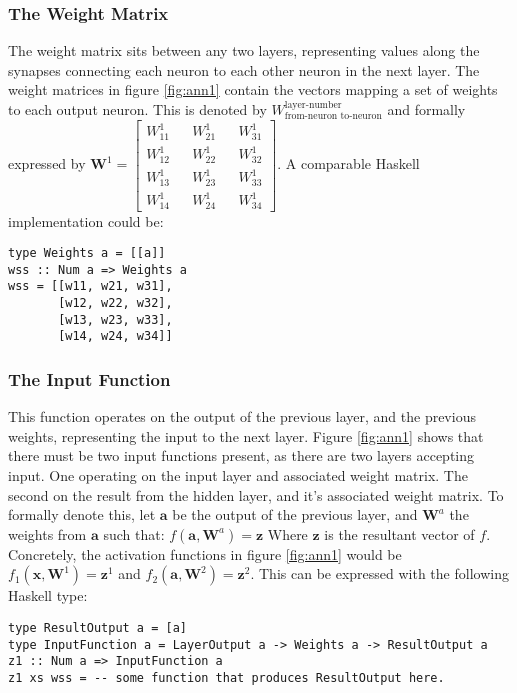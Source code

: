 \documentclass[a4paper]{article}
\begin{document}
\subsubsection{The Weight Matrix}
The weight matrix sits between any two layers, representing values along
the synapses connecting each neuron to each other neuron in the next layer.
The weight matrices in figure \ref{fig:ann1} contain the vectors mapping a set
of weights to each output neuron. This is denoted by 
$W^{\text{layer-number}}_{\text{from-neuron }\text{to-neuron} }$ and formally
expressed by $ \boldsymbol{W}^1 = \begin{bmatrix}
      W^1_{11} && W^1_{21} && W^1_{31} \\
      W^1_{12} && W^1_{22} && W^1_{32} \\
      W^1_{13} && W^1_{23} && W^1_{33} \\
      W^1_{14} && W^1_{24} && W^1_{34}
    \end{bmatrix} $. A comparable Haskell implementation could be:
\begin{verbatim}
type Weights a = [[a]]
wss :: Num a => Weights a
wss = [[w11, w21, w31],
       [w12, w22, w32],
       [w13, w23, w33],
       [w14, w24, w34]]
\end{verbatim}

\subsubsection{The Input Function}
This function operates on the output of the previous layer, and the previous
weights, representing the input to the next layer. Figure \ref{fig:ann1} shows 
that there must be two input functions present, as there are two
layers accepting input. One operating on the input layer and associated weight
matrix. The second on the result from the hidden layer, and it's associated
weight matrix. To formally denote this, let $\boldsymbol{a}$ be the output of 
the previous layer, and $\boldsymbol{W}^a$ the weights from
$\boldsymbol{a}$ such that: $f(\boldsymbol{a},\boldsymbol{W}^a) =
\boldsymbol{z}$ Where $\boldsymbol{z}$ is the resultant vector of $f$.
Concretely, the activation functions in figure \ref{fig:ann1} would be
  $f_1(\boldsymbol{x}, \boldsymbol{W}^1) = \boldsymbol{z}^1$ and
  $f_2(\boldsymbol{a}, \boldsymbol{W}^2) = \boldsymbol{z}^2$. This can be
expressed with the following Haskell type:
\begin{verbatim}
type ResultOutput a = [a]
type InputFunction a = LayerOutput a -> Weights a -> ResultOutput a
z1 :: Num a => InputFunction a
z1 xs wss = -- some function that produces ResultOutput here.
\end{verbatim}
\end{document}
